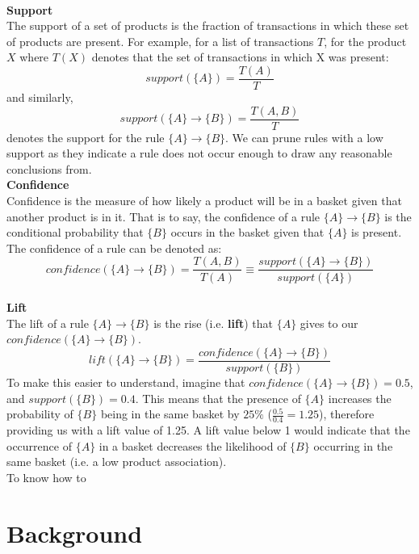 \documentclass[a4paper,11pt]{article}
\newcommand{\setA}{\{A\}}
\newcommand{\setB}{\{B\}}
\newcommand{\abrule}{\setA\rightarrow\setB}
\begin{document}
\\\textbf{Support}\\
The support of a set of products is the fraction of transactions in which these set of products are present. For example,  for a list of transactions $T$, for the product $X$ where $T(X)$ denotes that the set of transactions in which X was present:
\[
\textit{support}(\{A\}) = \frac{T(A)}{T}
\]
and similarly, 
\[
\textit{support}(\abrule) = \frac{T(A,B)}{T}
\]
denotes the support for the rule $\abrule$. We can prune rules with a low support as they indicate a rule does not occur enough to draw any reasonable conclusions from.
\\\textbf{Confidence}\\
Confidence is the measure of how likely a product will be in a basket given that another product is in it. That is to say,  the confidence of a rule $\abrule$ is the conditional probability that $\setB$ occurs in the basket given that $\setA$ is present. The confidence of a rule can be denoted as:
\[
\textit{confidence}(\abrule) = \frac{T(A, B)}{T(A)} \equiv \frac{\textit{support}(\abrule)}{\textit{support}(\setA)}
\]
\\\textbf{Lift}\\
The lift of a rule $\abrule$ is the rise (i.e. \textbf{lift}) that $\setA$ gives to our $\textit{confidence}(\abrule)$.
\[
\textit{lift}(\abrule) = \frac{confidence(\abrule)}{support(\setB)}
\]
To make this easier to understand, imagine that $\textit{confidence}(\abrule)=0.5$, and $\textit{support}(\setB)=0.4.$ This means that the presence of $\setA$ increases the probability of $\setB$ being in the same basket by $25\%$ ($\frac{0.5}{0.4}=1.25$), therefore providing us with a lift value of 1.25.  A lift value below 1 would indicate that the occurrence of $\setA$ in a basket decreases the likelihood of $\setB$ occurring in the same basket (i.e. a low product association).
\\
To know how to 
\section{Background}





\newpage
\printbibliography
\end{document}
